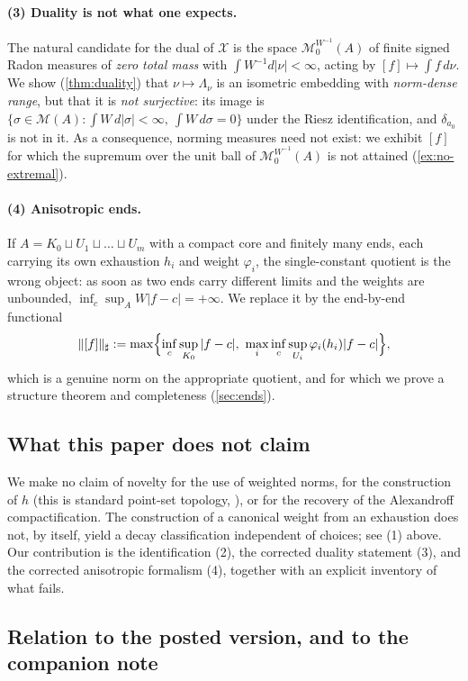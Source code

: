 \documentclass[11pt,a4paper]{article}
\numberwithin{equation}{section}
\theoremstyle{plain}
\theoremstyle{definition}
\theoremstyle{remark}
\newcommand{\Msp}{\mathcal{M}}
\newcommand{\Xdec}{\mathcal{X}}
\begin{document}
\paragraph{(3) Duality is not what one expects.} The natural candidate for the dual of
$\Xdec$ is the space $\Msp_0^{W^{-1}}(A)$ of finite signed Radon measures of \emph{zero
total mass} with $\int W^{-1}d|\nu|<\infty$, acting by $[f]\mapsto\int f\,d\nu$. We show
(\cref{thm:duality}) that $\nu\mapsto\Lambda_\nu$ is an isometric embedding with
\emph{norm-dense range}, but that it is \emph{not surjective}: its image is
$\{\sigma\in\Msp(A):\int W\,d|\sigma|<\infty,\ \int W\,d\sigma=0\}$ under the Riesz
identification, and $\delta_{a_0}$ is not in it. As a consequence, norming measures need
not exist: we exhibit $[f]$ for which the supremum over the unit ball of
$\Msp_0^{W^{-1}}(A)$ is not attained (\cref{ex:no-extremal}).

\paragraph{(4) Anisotropic ends.} If $A=K_0\sqcup U_1\sqcup\dots\sqcup U_m$ with a
compact core and finitely many ends, each carrying its own exhaustion $h_i$ and weight
$\varphi_i$, the single-constant quotient is the wrong object: as soon as two ends carry
different limits and the weights are unbounded, $\inf_c\sup_A W|f-c|=+\infty$. We replace
it by the end-by-end functional
\[
\|[f]\|_{\sharp}:=\max\Bigl\{\inf_{c}\sup_{K_0}|f-c|,\ \max_i \inf_{c}\sup_{U_i}\varphi_i(h_i)|f-c|\Bigr\},
\]
which is a genuine norm on the appropriate quotient, and for which we prove a structure
theorem and completeness (\cref{sec:ends}).

\subsection{What this paper does not claim}

We make no claim of novelty for the use of weighted norms, for the construction of $h$
(this is standard point-set topology, \cite[Ch.~4]{Lee2011}), or for the recovery of the
Alexandroff compactification. The construction of a canonical weight from an exhaustion
does not, by itself, yield a decay classification independent of choices; see (1) above.
Our contribution is the identification (2), the corrected duality statement (3), and the
corrected anisotropic formalism (4), together with an explicit inventory of what fails.

\subsection{Relation to the posted version, and to the companion note}
\end{document}
